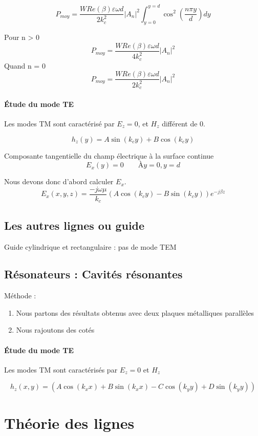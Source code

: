\documentclass[12pt,a4paper]{report}
\begin{document}
\[
	P_{moy} =  \dfrac{WRe(\beta) \varepsilon \omega d}{2 k_c^2} |A_n|^2 \int_{y=0}^{y=d} \cos^2\left ( \dfrac{n\pi y}{d} \right ) dy
\]

Pour n > 0 
\[
	P_{moy} = \dfrac{WRe(\beta) \varepsilon \omega d}{4 k_c^2} |A_n|^2
\]
Quand n = 0
\[
	P_{moy} = \dfrac{WRe(\beta) \varepsilon \omega d}{2 k_c^2} |A_n|^2
\]

\subsubsection{Étude du mode TE}

Les modes TM sont caractérisé par \(E_z = 0\), et \(H_z\) différent de 0.

\[
	h_z(y) = A\sin(k_c y) + B \cos(k_c y)
\]

Composante tangentielle du champ électrique à la surface continue
\[
	E_x(y) = 0 \qquad \text{À} y=0, y= d
\]

Nous devons donc d'abord calculer \(E_x\).
\[
	E_x (x,y,z)= \dfrac{-j\omega \mu }{k_c} \left ( A \cos(k_c y) - B \sin (k_c y) \right ) e^{-j \beta z}
\]

\section{Les autres lignes ou guide}

Guide cylindrique et rectangulaire : pas de mode TEM

\section{Résonateurs : Cavités résonantes}

Méthode : 
\begin{enumerate}
	\item Nous partons des résultats obtenus avec deux plaques métalliques parallèles
	\item Nous rajoutons des cotés
\end{enumerate}

\subsubsection{Étude du mode TE}

Les modes TM sont caractérisés par $ E_z = 0$ et $H_z$ 

\[
	h_z (x,y) = ( A \cos(k_x x ) + B \sin (k_x x) - C \cos (k_y y) + D \sin (k_y y))
\]

\chapter{Théorie des lignes}
\end{document}
